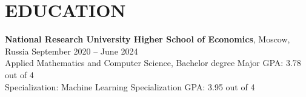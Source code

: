 \section*{EDUCATION}
\noindent
\textbf{National Research University Higher School of Economics}, Moscow, Russia 
\hfill September 2020 -- June 2024 
\\
Applied Mathematics and Computer Science, Bachelor degree 
\hfill  Major GPA: 3.78 out of 4 
\\
Specialization: Machine Learning
\hfill Specialization GPA: 3.95 out of 4


